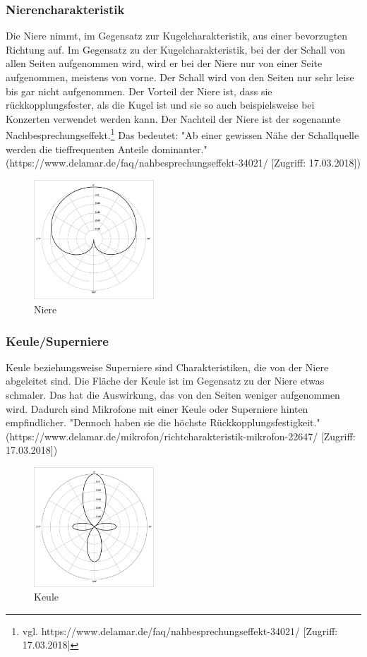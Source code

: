 \subsubsection{Nierencharakteristik}
Die Niere nimmt, im Gegensatz zur Kugelcharakteristik, aus einer bevorzugten Richtung auf. Im Gegensatz zu der Kugelcharakteristik, bei der der Schall von allen Seiten aufgenommen wird, wird er bei der Niere nur von einer Seite aufgenommen, meistens von vorne. Der Schall wird von den Seiten nur sehr leise bis gar nicht aufgenommen. Der Vorteil der Niere ist, dass sie rückkopplungsfester, als die Kugel ist und sie so auch beispielsweise bei Konzerten verwendet werden kann. Der Nachteil der Niere ist der sogenannte Nachbesprechungseffekt.\footnote{vgl. https://www.delamar.de/faq/nahbesprechungseffekt-34021/ [Zugriff: 17.03.2018]} Das bedeutet: "Ab einer gewissen Nähe der Schallquelle werden die tieffrequenten Anteile dominanter." (https://www.delamar.de/faq/nahbesprechungseffekt-34021/ [Zugriff: 17.03.2018])
\begin{figure}[H]
	\centering
	\includegraphics[width=0.4\textwidth]{abb5} 
	\caption[Niere]{Niere\footnotemark}
\end{figure}
\subsubsection{Keule/Superniere}
Keule beziehungsweise Superniere sind Charakteristiken, die von der Niere abgeleitet sind. Die Fläche der Keule ist im Gegensatz zu der Niere etwas schmaler. Das hat die Auswirkung, das von den Seiten weniger aufgenommen wird. Dadurch sind Mikrofone mit einer Keule oder Superniere hinten empfindlicher. "Dennoch haben sie die höchste Rückkopplungsfestigkeit." (https://www.delamar.de/mikrofon/richtcharakteristik-mikrofon-22647/ [Zugriff: 17.03.2018])
\begin{figure}[H]
	\centering
	\includegraphics[width=0.4\textwidth]{abb6} 
	\caption[Keule]{Keule\footnotemark}
\end{figure}
